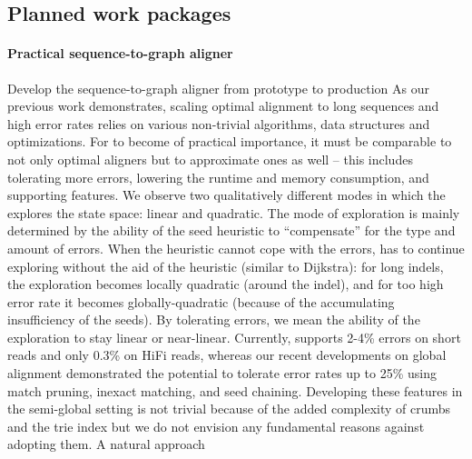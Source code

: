 
\subsection*{Planned work packages}

\paragraph{Practical sequence-to-graph aligner}
Develop the \astarix sequence-to-graph aligner from prototype to production As
our previous work demonstrates, scaling optimal \A alignment to long sequences
and high error rates relies on various non-trivial algorithms, data structures
and optimizations. For \astarix to become of practical importance, it must be
comparable to not only optimal aligners but to approximate ones as well -- this
includes tolerating more errors, lowering the runtime and memory consumption,
and supporting features. We observe two qualitatively different modes in which
the \A explores the state space: linear and quadratic. The mode of exploration
is mainly determined by the ability of the seed heuristic to ``compensate'' for
the type and amount of errors. When the heuristic cannot cope with the errors,
\A has to continue exploring without the aid of the heuristic (similar to
Dijkstra): for long indels, the exploration becomes locally quadratic (around
the indel), and for too high error rate it becomes globally-quadratic (because
of the accumulating insufficiency of the seeds). By tolerating errors, we mean
the ability of the exploration to stay linear or near-linear. Currently,
\astarix supports 2-4\% errors on short reads and only 0.3\% on HiFi reads,
whereas our recent developments on global alignment demonstrated the potential
to tolerate error rates up to 25\% using match pruning, inexact matching, and
seed chaining. Developing these features in the semi-global setting is not
trivial because of the added complexity of crumbs and the trie index but we do
not envision any fundamental reasons against adopting them. A natural approach
